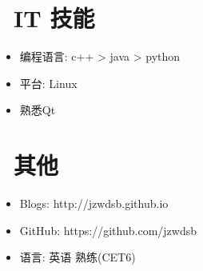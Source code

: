 \documentclass{resume}
\begin{document}

\section{\faCogs\ IT 技能}
\begin{itemize}[parsep=0.5ex]
  \item 编程语言: c++ > java > python
  \item 平台: Linux
  \item 熟悉Qt
\end{itemize}

\section{\faInfo\ 其他}
\begin{itemize}[parsep=0.5ex]
  \item Blogs: http://jzwdsb.github.io
  \item GitHub: https://github.com/jzwdsb
  \item 语言: 英语 熟练(CET6)
\end{itemize}

%
%
\end{document}
